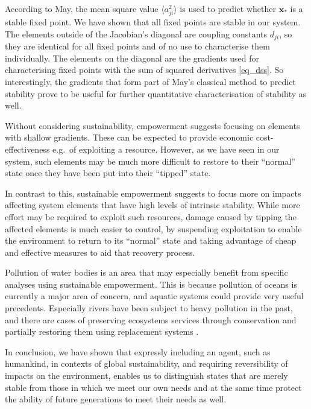 \documentclass[conference]{IEEEtran}
\newcommand{\vectorsym}[1]{\ensuremath{\mathbf{#1}}}
\newcommand{\couplingconstant}{\ensuremath{d}}
\begin{document}
According to May, the mean square value $\langle a_{ji}^2 \rangle$ is
used to predict whether $\vectorsym{x}_*$ is a stable fixed point. We
have shown that all fixed points are stable in our system. The
elements outside of the Jacobian's diagonal are coupling constants
$\couplingconstant_{ji}$, so they are identical for all fixed points
and of no use to characterise them individually. The elements on the
diagonal are the gradients used for characterising fixed points with
the sum of squared derivatives \eqref{eq_dss}. So interestingly, the
gradients that form part of May's classical method to predict
stability prove to be useful for further quantitative characterisation
of stability as well.

Without considering sustainability, empowerment suggests focusing on
elements with shallow gradients. These can be expected to provide
economic cost-effectiveness e.g.\ of exploiting a resource. However,
as we have seen in our system, such elements may be much more
difficult to restore to their ``normal'' state once they have been put
into their ``tipped'' state.

In contrast to this, sustainable empowerment suggests to focus more on
impacts affecting system elements that have high levels of intrinsic
stability. While more effort may be required to exploit such
resources, damage caused by tipping the affected elements is much
easier to control, by suspending exploitation to enable the
environment to return to its ``normal'' state and taking advantage of
cheap and effective measures to aid that recovery process.

Pollution of water bodies is an area that may especially benefit from
specific analyses using sustainable empowerment. This is because
pollution of oceans is currently a major area of concern, and aquatic
systems could provide very useful precedents. Especially rivers have
been subject to heavy pollution in the past, and there are cases of
preserving ecosystems services through conservation and partially
restoring them using replacement systems
\cite{Geist2016_aquatichabitatrecovery}.

In conclusion, we have shown that expressly including an agent,
such as humankind, in contexts of global sustainability, and requiring
reversibility of impacts on the environment, enables us to distinguish
states that are merely stable from those in which we meet our own
needs and at the same time protect the ability of future generations
to meet their needs as well.

\end{document}

